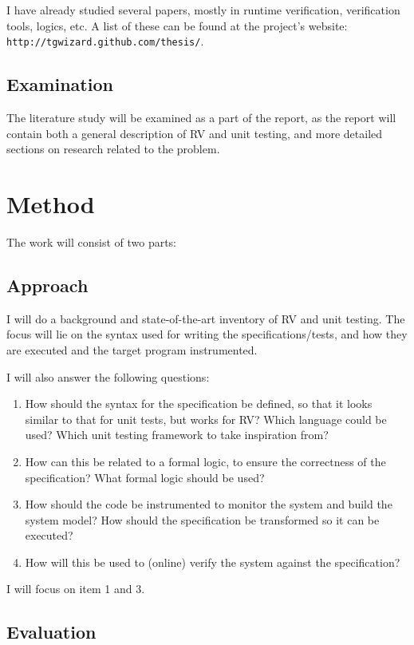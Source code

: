 \documentclass[a4paper,11pt]{article}
\begin{document}
I have already studied several papers, mostly in runtime verification, verification tools, logics, etc.
A list of these can be found at the project's website: \texttt{http://tgwizard.github.com/thesis/}.

\subsection{Examination}

The literature study will be examined as a part of the report, as the report will contain
both a general description of RV and unit testing, and more detailed sections on research related to the problem.


\section{Method}

The work will consist of two parts:


\subsection{Approach}

I will do a background and state-of-the-art inventory of RV and unit testing. The focus will lie on the syntax used for writing the specifications/tests, and how they are executed and the target program instrumented.

I will also answer the following questions:

\begin{enumerate}
	\item How should the syntax for the specification be defined,
		so that it looks similar to that for unit tests, but works for RV?
		Which language could be used? Which unit testing framework to take inspiration from?
	\item How can this be related to a formal logic, to ensure the correctness of the specification?
		What formal logic should be used? 
	\item How should the code be instrumented to monitor the system and build the system model?
		How should the specification be transformed so it can be executed? 
	\item How will this be used to (online) verify the system against the specification?
\end{enumerate}

I will focus on item 1 and 3.


\subsection{Evaluation}
\end{document}
